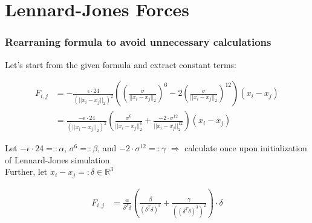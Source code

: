 \section{Lennard-Jones Forces}

\begin{frame}
    \frametitle{Rearraning formula to avoid unnecessary calculations}
    
    Let's start from the given formula and extract constant terms:

    \begin{align}
        F_{i,j} &= -\frac{\epsilon \cdot 24}{(||x_i-x_j||_2)^2} \left( \left( \frac{\sigma}{||x_i-x_j||_2} \right) ^6 - 2 \left( \frac{\sigma}{||x_i-x_j||_2} \right) ^{12} \right) (x_i-x_j) \\
                &= \frac{-\epsilon \cdot 24}{(||x_i-x_j||_2)^2} \left(  \frac{\sigma ^6 }{||x_i-x_j||_2 ^6 } + \frac{-2 \cdot \sigma^{12}}{||x_i-x_j||_2^{12}}  \right) (x_i-x_j)
    \end{align}

    Let $-\epsilon \cdot 24 =: \alpha$, $\sigma ^6 =: \beta$, and $-2 \cdot \sigma^{12} =: \gamma$ $\Rightarrow$ calculate once upon initialization of Lennard-Jones simulation \\
    Further, let $x_i-x_j =: \delta \in \mathbb{R}^3$

    \begin{align}
        F_{i,j} &= \frac{\alpha}{\delta ^T\delta} \left(  \frac{\beta}{(\delta ^T\delta) ^3} + \frac{\gamma}{((\delta ^T\delta) ^3) ^2}  \right) \cdot \delta
    \end{align} 

\end{frame}